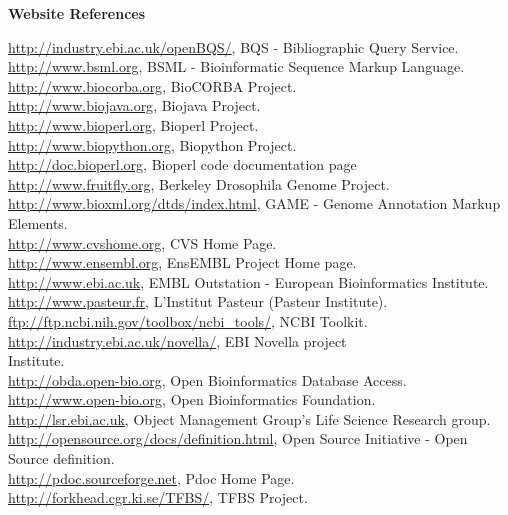 \documentclass[12pt]{article}
\begin{document}
\begin{center}{\large \textbf{Website References}}\end{center}
\par \noindent
\url{http://industry.ebi.ac.uk/openBQS/}, BQS - Bibliographic Query Service.\\
\url{http://www.bsml.org}, BSML - Bioinformatic Sequence Markup Language. \\
\url{http://www.biocorba.org}, BioCORBA Project. \\
\url{http://www.biojava.org}, Biojava Project. \\
\url{http://www.bioperl.org}, Bioperl Project. \\
\url{http://www.biopython.org}, Biopython Project. \\
\url{http://doc.bioperl.org}, Bioperl code documentation page \\
\url{http://www.fruitfly.org}, Berkeley Drosophila Genome Project.\\
\url{http://www.bioxml.org/dtds/index.html},  GAME - Genome
Annotation Markup Elements. \\ 
\url{http://www.cvshome.org}, CVS Home Page. \\
\url{http://www.ensembl.org}, EnsEMBL Project Home page. \\
\url{http://www.ebi.ac.uk}, EMBL Outstation - European Bioinformatics
Institute. \\ 
\url{http://www.pasteur.fr}, L'Institut Pasteur (Pasteur Institute). \\
\url{ftp://ftp.ncbi.nih.gov/toolbox/ncbi_tools/}, NCBI Toolkit. \\
\url{http://industry.ebi.ac.uk/novella/}, EBI Novella project \\
Institute. \\ 
\url{http://obda.open-bio.org}, Open Bioinformatics Database Access. \\
\url{http://www.open-bio.org}, Open Bioinformatics Foundation. \\
\url{http://lsr.ebi.ac.uk}, Object Management Group's Life Science Research group. \\
\url{http://opensource.org/docs/definition.html}, Open Source
Initiative - Open Source definition. \\
\url{http://pdoc.sourceforge.net}, Pdoc Home Page. \\
\url{http://forkhead.cgr.ki.se/TFBS/}, TFBS Project. \\

\newpage
\end{document}
